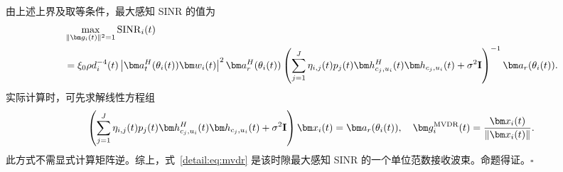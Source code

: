由上述上界及取等条件，最大感知 SINR 的值为
\begin{align}\label{detail:eq:maximum-value}
&\max_{\|\bm g_i(t)\|^2=1}\operatorname{SINR}_i(t)\notag\\
&=\xi_0\rho d_i^{-4}(t)
\left|\bm a_t^H(\theta_i(t))\bm w_i(t)\right|^2
\bm a_r^H(\theta_i(t))
\left(\sum_{j=1}^J\eta_{i,j}(t)p_j(t)
\bm h_{c_j,u_i}^{H}(t)\bm h_{c_j,u_i}(t)
+\sigma^2\mathbf I\right)^{-1}\bm a_r(\theta_i(t)).
\end{align}
实际计算时，可先求解线性方程组
\begin{equation}\label{detail:eq:solve}
\left(\sum_{j=1}^J\eta_{i,j}(t)p_j(t)
\bm h_{c_j,u_i}^{H}(t)\bm h_{c_j,u_i}(t)
+\sigma^2\mathbf I\right)\bm x_i(t)=\bm a_r(\theta_i(t)),
\quad
\bm g_i^{\rm MVDR}(t)=\frac{\bm x_i(t)}{\|\bm x_i(t)\|}.
\end{equation}
此方式不需显式计算矩阵逆。综上，式~\eqref{detail:eq:mvdr} 是该时隙最大感知 SINR 的一个单位范数接收波束。命题得证。\hfill$\square$


